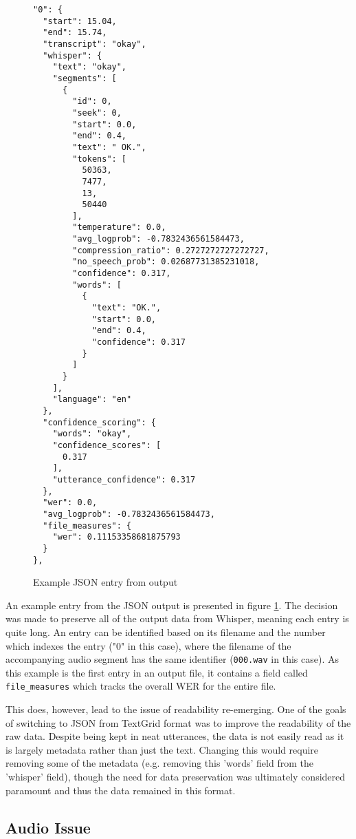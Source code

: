 \begin{figure}[p]
\centering
\begin{BVerbatim}
"0": {
  "start": 15.04,
  "end": 15.74,
  "transcript": "okay",
  "whisper": {
    "text": "okay",
    "segments": [
      {
        "id": 0,
        "seek": 0,
        "start": 0.0,
        "end": 0.4,
        "text": " OK.",
        "tokens": [
          50363,
          7477,
          13,
          50440
        ],
        "temperature": 0.0,
        "avg_logprob": -0.7832436561584473,
        "compression_ratio": 0.2727272727272727,
        "no_speech_prob": 0.02687731385231018,
        "confidence": 0.317,
        "words": [
          {
            "text": "OK.",
            "start": 0.0,
            "end": 0.4,
            "confidence": 0.317
          }
        ]
      }
    ],
    "language": "en"
  },
  "confidence_scoring": {
    "words": "okay",
    "confidence_scores": [
      0.317
    ],
    "utterance_confidence": 0.317
  },
  "wer": 0.0,
  "avg_logprob": -0.7832436561584473,
  "file_measures": {
    "wer": 0.11153358681875793
  }
},
\end{BVerbatim}
  \caption{Example JSON entry from output}
  \label{fig:json-output-example}
\end{figure}

\clearpage
An example entry from the JSON output is presented in figure \ref{fig:json-output-example}.
The decision was made to preserve all of the output data from Whisper, meaning each entry is quite long.
An entry can be identified based on its filename and the number which indexes the entry ("0" in this case), where the filename of the accompanying audio segment has the same identifier (\texttt{000.wav} in this case).
As this example is the first entry in an output file, it contains a field called \texttt{file\_measures} which tracks the overall WER for the entire file.

This does, however, lead to the issue of readability re-emerging.
One of the goals of switching to JSON from TextGrid format was to improve the readability of the raw data.
Despite being kept in neat utterances, the data is not easily read as it is largely metadata rather than just the text.
Changing this would require removing some of the metadata (e.g. removing this 'words' field from the 'whisper' field), though the need for data preservation was ultimately considered paramount and thus the data remained in this format.

\subsection{Audio Issue}

